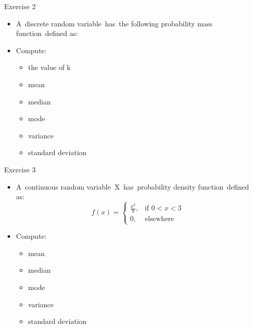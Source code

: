 \documentclass{beamer}
\begin{document}
\begin{frame}
{\centerline{Exercise 2}}
\begin{itemize}
    \item A discrete random variable has the following probability mass function defined as:
    \newline
    \begin{center}

    \end{center}

    \newline
    \item Compute:
    \begin{itemize}
        \item the value of k
        \item mean
        \item median
        \item mode
        \item variance
        \item standard deviation
    \end{itemize}
\end{itemize}
\end{frame}


\begin{frame}
{\centerline{Exercise 3}}
\begin{itemize}
    \item A continuous random variable X has probability density function defined as:
    \begin{equation*}
        
  f(x)=\left\{
        \begin{array}{ll}
             \frac{x^{2}}{9}, & \mbox{if $0<x<3$}\\
                0, & \mbox{elsewhere}
         \end{array}
        \right.
    \end{equation*}
    \newline
    \item Compute:
    \begin{itemize}
        \item mean
        \item median
        \item mode
        \item variance
        \item standard deviation
    \end{itemize}
\end{itemize}
\end{frame}
\end{document}
